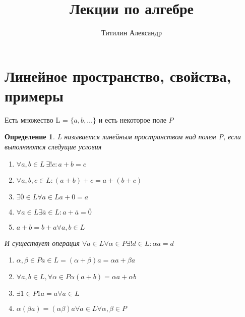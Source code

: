 \documentclass{scrartcl}
\title{Лекции по алгебре}
\author{Титилин Александр}
\date{}
\newtheorem{definition}{Определение}
\begin{document}
\maketitle
\section{Линейное пространство, свойства, примеры}
Есть множество L = $\{a,b,\dots\}$ и есть некоторое поле  $P$
\begin{definition}
	L называется линейным пространством над полем P, если выполняются следущие условия
	\begin{enumerate}
		\item $\forall a,b \in L ~ \exists ! c : a + b = c$
		\item $\forall a,b,c \in L : (a + b) + c = a + (b + c)$
		\item $\exists  \overline{0} \in L \forall  a \in L a + 0 = a$
		\item $\forall  a\in L \exists  \overline{a} \in L : a +  \overline{a} = \overline{0}$
		\item $a + b = b + a \forall  a,b \in L$
	\end{enumerate}
	И существует операция $\forall  a\in L \forall  \alpha \in P \exists ! d \in L : \alpha a = d$
	\begin{enumerate}
		\item $\alpha , \beta \in  P a \in L = (\alpha + \beta)a = \alpha a + \beta a$
		\item  $\forall  a,b \in L , \forall \alpha \in P \alpha(a + b) = \alpha a + \alpha b $
		\item $\exists  1 \in P 1a = a \forall a \in L$
		\item $\alpha(\beta a) = (\alpha \beta)a \forall a \in L \forall \alpha ,\beta \in P $
	\end{enumerate}
\end{definition}
\end{document}

